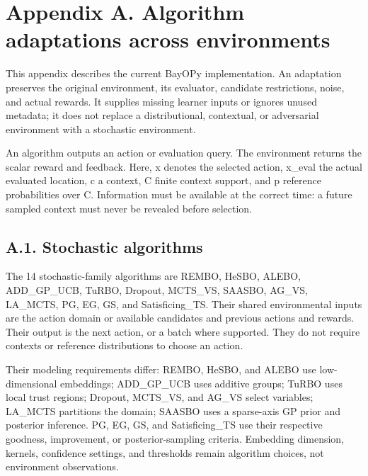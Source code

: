\documentclass[10pt,a4paper]{article}
\begin{document}
\clearpage
{}
\section*{Appendix A. Algorithm adaptations across environments}

This appendix describes the current BayOPy implementation. An adaptation preserves the original environment,\allowbreak{} its evaluator,\allowbreak{} candidate restrictions,\allowbreak{} noise,\allowbreak{} and actual rewards. It supplies missing learner inputs or ignores unused metadata; it does not replace a distributional,\allowbreak{} contextual,\allowbreak{} or adversarial environment with a stochastic environment.


An algorithm outputs an action or evaluation query. The environment returns the scalar reward and feedback. Here,\allowbreak{} x denotes the selected action,\allowbreak{} x\_\allowbreak{}eval the actual evaluated location,\allowbreak{} c a context,\allowbreak{} C finite context support,\allowbreak{} and p reference probabilities over C. Information must be available at the correct time: a future sampled context must never be revealed before selection.


\subsection*{A.1. Stochastic algorithms}

The 14 stochastic-family algorithms are REMBO,\allowbreak{} HeSBO,\allowbreak{} ALEBO,\allowbreak{} ADD\_\allowbreak{}GP\_\allowbreak{}UCB,\allowbreak{} TuRBO,\allowbreak{} Dropout,\allowbreak{} MCTS\_\allowbreak{}VS,\allowbreak{} SAASBO,\allowbreak{} AG\_\allowbreak{}VS,\allowbreak{} LA\_\allowbreak{}MCTS,\allowbreak{} PG,\allowbreak{} EG,\allowbreak{} GS,\allowbreak{} and Satisficing\_\allowbreak{}TS. Their shared environmental inputs are the action domain or available candidates and previous actions and rewards. Their output is the next action,\allowbreak{} or a batch where supported. They do not require contexts or reference distributions to choose an action.


Their modeling requirements differ: REMBO,\allowbreak{} HeSBO,\allowbreak{} and ALEBO use low-dimensional embeddings; ADD\_\allowbreak{}GP\_\allowbreak{}UCB uses additive groups; TuRBO uses local trust regions; Dropout,\allowbreak{} MCTS\_\allowbreak{}VS,\allowbreak{} and AG\_\allowbreak{}VS select variables; LA\_\allowbreak{}MCTS partitions the domain; SAASBO uses a sparse-axis GP prior and posterior inference. PG,\allowbreak{} EG,\allowbreak{} GS,\allowbreak{} and Satisficing\_\allowbreak{}TS use their respective goodness,\allowbreak{} improvement,\allowbreak{} or posterior-sampling criteria. Embedding dimension,\allowbreak{} kernels,\allowbreak{} confidence settings,\allowbreak{} and thresholds remain algorithm choices,\allowbreak{} not environment observations.
\end{document}
